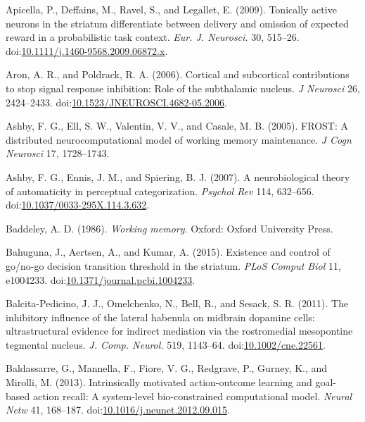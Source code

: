 \documentclass[
  11pt,
  a4paper,
]{scrbook}
\newlength{\cslhangindent}
\newenvironment{CSLReferences}[2] %
 {\begin{list}{}{%
  \setlength{\itemindent}{0pt}
  \setlength{\leftmargin}{0pt}
  \setlength{\parsep}{0pt}
  \ifodd #1
   \setlength{\leftmargin}{\cslhangindent}
   \setlength{\itemindent}{-1\cslhangindent}
  \fi
  \setlength{\itemsep}{#2\baselineskip}}}
 {\end{list}}
\begin{document}
\begin{CSLReferences}{1}{1}
Apicella, P., Deffains, M., Ravel, S., and Legallet, E. (2009).
{Tonically active neurons in the striatum differentiate between delivery
and omission of expected reward in a probabilistic task context.}
\emph{Eur. J. Neurosci.} 30, 515--26.
doi:\href{https://doi.org/10.1111/j.1460-9568.2009.06872.x}{10.1111/j.1460-9568.2009.06872.x}.

Aron, A. R., and Poldrack, R. A. (2006). Cortical and subcortical
contributions to stop signal response inhibition: Role of the
subthalamic nucleus. \emph{J Neurosci} 26, 2424--2433.
doi:\href{https://doi.org/10.1523/JNEUROSCI.4682-05.2006}{10.1523/JNEUROSCI.4682-05.2006}.

Ashby, F. G., Ell, S. W., Valentin, V. V., and Casale, M. B. (2005).
FROST: A distributed neurocomputational model of working memory
maintenance. \emph{J Cogn Neurosci} 17, 1728--1743.

Ashby, F. G., Ennis, J. M., and Spiering, B. J. (2007). A
neurobiological theory of automaticity in perceptual categorization.
\emph{Psychol Rev} 114, 632--656.
doi:\href{https://doi.org/10.1037/0033-295X.114.3.632}{10.1037/0033-295X.114.3.632}.

Baddeley, A. D. (1986). \emph{Working memory}. Oxford: Oxford University
Press.

Bahuguna, J., Aertsen, A., and Kumar, A. (2015). Existence and control
of go/no-go decision transition threshold in the striatum. \emph{PLoS
Comput Biol} 11, e1004233.
doi:\href{https://doi.org/10.1371/journal.pcbi.1004233}{10.1371/journal.pcbi.1004233}.

Balcita-Pedicino, J. J., Omelchenko, N., Bell, R., and Sesack, S. R.
(2011). {The inhibitory influence of the lateral habenula on midbrain
dopamine cells: ultrastructural evidence for indirect mediation via the
rostromedial mesopontine tegmental nucleus.} \emph{J. Comp. Neurol.}
519, 1143--64.
doi:\href{https://doi.org/10.1002/cne.22561}{10.1002/cne.22561}.

Baldassarre, G., Mannella, F., Fiore, V. G., Redgrave, P., Gurney, K.,
and Mirolli, M. (2013). Intrinsically motivated action-outcome learning
and goal-based action recall: A system-level bio-constrained
computational model. \emph{Neural Netw} 41, 168--187.
doi:\href{https://doi.org/10.1016/j.neunet.2012.09.015}{10.1016/j.neunet.2012.09.015}.


\end{CSLReferences}
\end{document}
